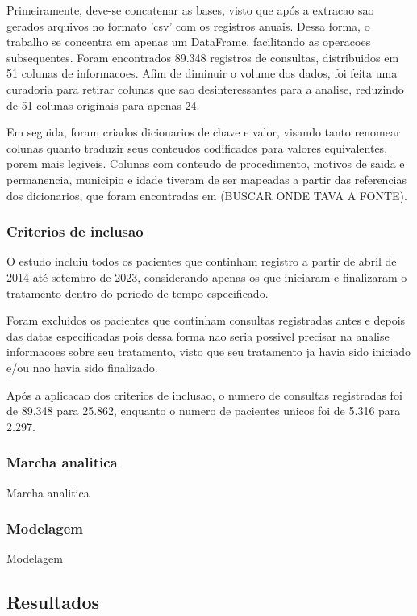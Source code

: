 \documentclass[article,a4paper,12pt,brazil,sumario=tradicional]{abntex2}
\begin{document}
Primeiramente, deve-se concatenar as bases, visto que após a extracao sao gerados arquivos no formato 'csv' com os registros anuais. Dessa forma, o trabalho se concentra em apenas um DataFrame, facilitando as operacoes subsequentes. Foram encontrados 89.348 registros de consultas, distribuidos em 51 colunas de informacoes. Afim de diminuir o volume dos dados, foi feita uma curadoria para retirar colunas que sao desinteressantes para a analise, reduzindo de 51 colunas originais para apenas 24.

Em seguida, foram criados dicionarios de chave e valor, visando tanto renomear colunas quanto traduzir seus conteudos codificados para valores equivalentes, porem mais legiveis. Colunas com conteudo de procedimento, motivos de saida e permanencia, municipio e idade tiveram de ser mapeadas a partir das referencias dos dicionarios, que foram encontradas em (BUSCAR ONDE TAVA A FONTE).

\subsubsection{Criterios de inclusao}

O estudo incluiu todos os pacientes que continham registro a partir de abril de 2014 até setembro de 2023, considerando apenas os que iniciaram e finalizaram o tratamento dentro do periodo de tempo especificado. 

Foram excluidos os pacientes que continham consultas registradas antes e depois das datas especificadas pois dessa forma nao seria possivel precisar na analise informacoes sobre seu tratamento, visto que seu tratamento ja havia sido iniciado e/ou nao havia sido finalizado.

Após a aplicacao dos criterios de inclusao, o numero de consultas registradas foi de 89.348 para 25.862, enquanto o numero de pacientes unicos foi de 5.316 para 2.297.

\subsubsection{Marcha analitica}

Marcha analitica

\subsubsection{Modelagem}

Modelagem

\subsection{Resultados}
\end{document}
